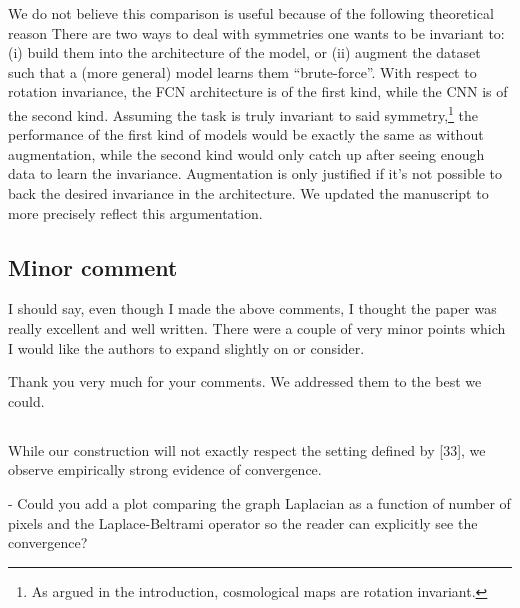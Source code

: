 \documentclass[12pt,a4paper]{article}
\newcommand{\nati}[1]{{\color[rgb]{.1,.6,.1}{NP: #1}}}
\newcommand{\mdeff}[1]{{\color[rgb]{.1,.6,.1}{MD: #1}}}
\newcommand{\TK}[1]{{\color{red}{TK: #1}}}
\newcommand{\1}{\b{1}}              %
\newcommand{\0}{\b{0}}              %
\begin{document}
We do not believe this comparison is useful because of the following theoretical reason
There are two ways to deal with symmetries one wants to be invariant to: (i) build them into the architecture of the model, or (ii) augment the dataset such that a (more general) model learns them ``brute-force''.
With respect to rotation invariance, the FCN architecture is of the first kind, while the CNN is of the second kind.
Assuming the task is truly invariant to said symmetry,\footnote{As argued in the introduction, cosmological maps are rotation invariant.} the performance of the first kind of models would be exactly the same as without augmentation, while the second kind would only catch up after seeing enough data to learn the invariance.
Augmentation is only justified if it's not possible to back the desired invariance in the architecture.
We updated the manuscript to more precisely reflect this argumentation.

\TK{Seems a bit strong to me.. maybe we would write it in a softer language?}
\nati{Now it is OK. But is it still strong enough. We should only point reviewer incoherence if necessary.}


\subsection*{Minor comment}

\begin{mdframed}[style=comment]
I should say, even though I made the above comments, I thought the paper was really excellent and well written. There were a couple of very minor points which I would like the authors to expand slightly on or consider.
\end{mdframed}
Thank you very much for your comments. We addressed them to the best we could.

\subsection{}
\begin{mdframed}[style=comment]
While our construction will not exactly respect the setting defined by [33], we observe empirically strong evidence of convergence.

- Could you add a plot comparing the graph Laplacian as a function of number of pixels and the Laplace-Beltrami operator so the reader can explicitly see the convergence?
\end{mdframed}
\end{document}
